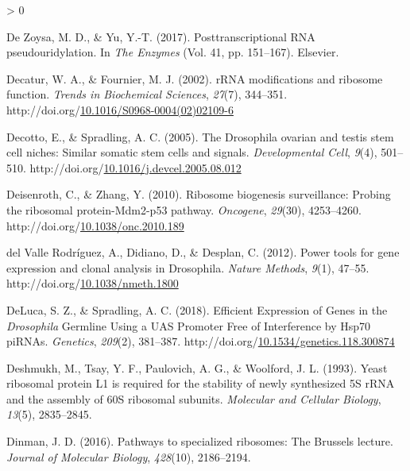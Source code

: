 \documentclass[12pt,oneside]{reedthesis}
\newlength{\cslhangindent}
\newenvironment{CSLReferences}[2] %
 {%
  \setlength{\parindent}{0pt}
  \ifodd #1 \everypar{\setlength{\hangindent}{\cslhangindent}}\ignorespaces\fi
  \ifnum #2 > 0
  \setlength{\parskip}{#2\baselineskip}
  \fi
 }%
 {}
\begin{document}
\begin{CSLReferences}{1}{0}
\leavevmode\hypertarget{ref-DeZoysa2017}{}%
De Zoysa, M. D., \& Yu, Y.-T. (2017). Posttranscriptional {RNA} pseudouridylation. In \emph{The {Enzymes}} (Vol. 41, pp. 151--167). {Elsevier}.

\leavevmode\hypertarget{ref-Decatur2002b}{}%
Decatur, W. A., \& Fournier, M. J. (2002). {rRNA} modifications and ribosome function. \emph{Trends in Biochemical Sciences}, \emph{27}(7), 344--351. http://doi.org/\href{https://doi.org/10.1016/S0968-0004(02)02109-6}{10.1016/S0968-0004(02)02109-6}

\leavevmode\hypertarget{ref-decottoDrosophilaOvarianTestis2005}{}%
Decotto, E., \& Spradling, A. C. (2005). The {Drosophila} ovarian and testis stem cell niches: Similar somatic stem cells and signals. \emph{Developmental Cell}, \emph{9}(4), 501--510. http://doi.org/\href{https://doi.org/10.1016/j.devcel.2005.08.012}{10.1016/j.devcel.2005.08.012}

\leavevmode\hypertarget{ref-Deisenroth2010e}{}%
Deisenroth, C., \& Zhang, Y. (2010). Ribosome biogenesis surveillance: {Probing} the ribosomal protein-{Mdm2-p53} pathway. \emph{Oncogene}, \emph{29}(30), 4253--4260. http://doi.org/\href{https://doi.org/10.1038/onc.2010.189}{10.1038/onc.2010.189}

\leavevmode\hypertarget{ref-delvallerodriguezPowerToolsGene2012}{}%
del Valle Rodríguez, A., Didiano, D., \& Desplan, C. (2012). Power tools for gene expression and clonal analysis in {Drosophila}. \emph{Nature Methods}, \emph{9}(1), 47--55. http://doi.org/\href{https://doi.org/10.1038/nmeth.1800}{10.1038/nmeth.1800}

\leavevmode\hypertarget{ref-delucaEfficientExpressionGenes2018}{}%
DeLuca, S. Z., \& Spradling, A. C. (2018). Efficient {Expression} of {Genes} in the {\emph{Drosophila}} {Germline Using} a {UAS Promoter Free} of {Interference} by {Hsp70 piRNAs}. \emph{Genetics}, \emph{209}(2), 381--387. http://doi.org/\href{https://doi.org/10.1534/genetics.118.300874}{10.1534/genetics.118.300874}

\leavevmode\hypertarget{ref-Deshmukh1993a}{}%
Deshmukh, M., Tsay, Y. F., Paulovich, A. G., \& Woolford, J. L. (1993). Yeast ribosomal protein {L1} is required for the stability of newly synthesized {5S rRNA} and the assembly of {60S} ribosomal subunits. \emph{Molecular and Cellular Biology}, \emph{13}(5), 2835--2845.

\leavevmode\hypertarget{ref-Dinman2016a}{}%
Dinman, J. D. (2016). Pathways to specialized ribosomes: The {Brussels} lecture. \emph{Journal of Molecular Biology}, \emph{428}(10), 2186--2194.


\end{CSLReferences}
\end{document}
